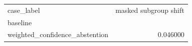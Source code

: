 \begin{tabular}{lr}
\toprule
case_label & masked subgroup shift \\
baseline &  \\
\midrule
weighted_confidence_abstention & 0.046000 \\
\bottomrule
\end{tabular}
